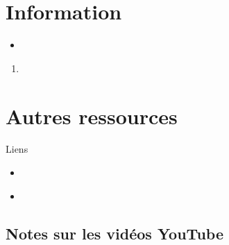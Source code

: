 \section{Information}

\begin{distributions}[Objectives]
\begin{itemize}
	\item	
\end{itemize}
\end{distributions}

\begin{outcomes}
\begin{enumerate}
	\item	
\end{enumerate}
\end{outcomes}

\clearpage

\section{Autres ressources}
\begin{FORMULA_SUMM}{Liens}
\begin{itemize}
	\item	
\end{itemize}
\end{FORMULA_SUMM}

\begin{YTB_vids}
\begin{itemize}
	\item	
\end{itemize}
\end{YTB_vids}

\subsection{Notes sur les vidéos YouTube}

%
